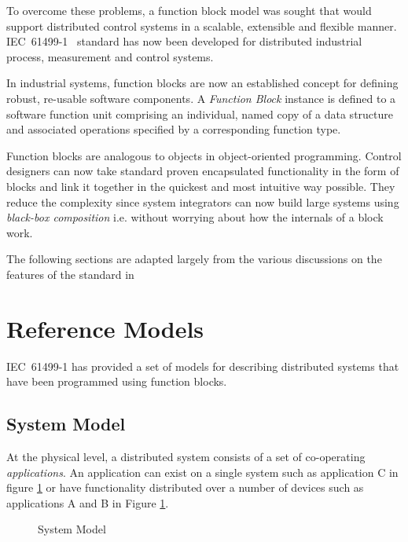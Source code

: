 To overcome these problems, a function block model was
sought that would support distributed control systems in a
scalable, extensible and flexible manner.
IEC~61499-1~\cite{iec:614991:2000} standard has now been
developed for distributed industrial process, measurement
and control systems.

In industrial systems, function blocks are now an
established concept for defining robust, re-usable software
components. A {\it Function Block} instance is defined to a
software function unit comprising an individual, named copy
of a data structure and associated operations specified by a
corresponding function type.

Function blocks are analogous to objects in object-oriented
programming. Control designers can now take standard proven
encapsulated functionality in the form of blocks and link it
together in the quickest and most intuitive way possible.
They reduce the complexity since system integrators can now
build large systems using {\it black-box composition} i.e.
without worrying about how the internals of a block work.

The following sections are adapted largely from the various
discussions on the features of the standard in
~\cite{iec:614991:2000, iec:1131:1993, l:pro:1995,
  l:mod:2001, c:des:2002, c:ope:2002}




\section{Reference Models}
IEC~61499-1 has provided a set of models for describing
distributed systems that have been programmed using function
blocks.

\subsection{System Model} 
At the physical level, a distributed system consists of a
set of co-operating {\it applications}. An application can
exist on a single system such as application C in figure
\ref{f:System_Model} or have functionality distributed over
a number of devices such as applications A and B in Figure
\ref{f:System_Model}.

\begin{figure}
  \begin{center}
    \caption[System Model]
            {System Model{\protect ~\cite{iec:614991:2000}}}
    \label{f:System_Model}
  \end{center}
\end{figure}

